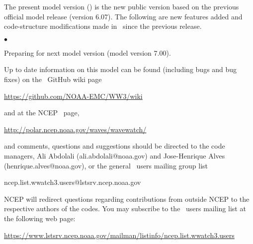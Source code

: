 \vspace{\baselineskip} 
\noindent 
The present model version (\WWver) is the new public version based on the
previous official model release (version 6.07). The following are new features added 
and code-structure modifications made in \ws\ \WWver since the previous release.

\begin{list}{$\bullet$}{\rightmargin 5mm \parsep 0mm \itemsep 0mm}

\item Preparing for next model version (model version 7.00).

\end{list}

\vspace{\baselineskip} \noindent 
Up to date information on this model can be found (including bugs and bug
fixes) on the \ws\ GitHub wiki page
\begin{center}
\url{https://github.com/NOAA-EMC/WW3/wiki}
\end{center}
and at the NCEP \ws\ page, 
\begin{center}
\url{http://polar.ncep.noaa.gov/waves/wavewatch/}
\end{center}
and comments, questions and suggestions should be
directed to the code managers, Ali Abdolali (ali.abdolali@noaa.gov) and Jose-Henrique Alves (henrique.alves@noaa.gov), or the general \ws\ users mailing group list

\begin{center}
ncep.list.wwatch3.users@lstsrv.ncep.noaa.gov
\end{center}

\noindent
NCEP will redirect questions regarding contributions from outside NCEP to the
respective authors of the codes. You may subscribe to the \ws\ users 
mailing list at the following web page:
\begin{center}
\footnotesize
\url{https://www.lstsrv.ncep.noaa.gov/mailman/listinfo/ncep.list.wwatch3.users}
\end{center} 

\nocite{tol:OMOD02b}
\nocite{tol:PACO02}
\nocite{tol:GAOS02}
\nocite{tol:OMB02b}
\nocite{tol:OMB02c}
